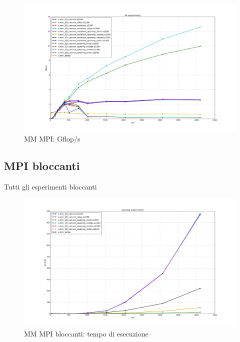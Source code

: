 \begin{figure}[htbp]
    \begin{center}
        \includegraphics[width=15cm]{immagini/all_gflops.png}
    \end{center}
    \caption{MM MPI: Gflop/s}
    \label{fig:all_gflops}
\end{figure}

\subsection{MPI bloccanti}

Tutti gli esperimenti bloccanti

\begin{figure}[htbp]
    \begin{center}
        \includegraphics[width=15cm]{immagini/blocking_times.png}
    \end{center}
    \caption{MM MPI bloccanti: tempo di esecuzione}
    \label{fig:blocking_times}
\end{figure}

